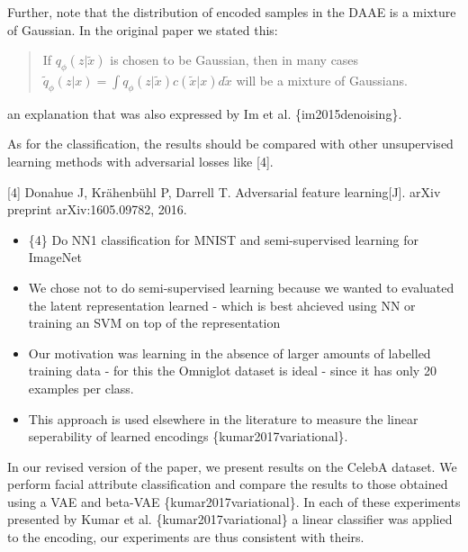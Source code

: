 \documentclass{article}
\begin{document}
Further, note that the distribution of encoded samples in the DAAE is a mixture of Gaussian. In the original paper we stated this:

\begin{quote}
If $q_\phi(z|\tilde{x})$ is chosen to be Gaussian, then in many cases $\tilde{q}_\phi(z|x) = \int q_\phi(z|\tilde{x})c(\tilde{x}|x)d \tilde{x}$ will be a mixture of Gaussians.
\end{quote}
an explanation that was also expressed by Im et al. \{im2015denoising\}.\\



{\color{blue}
As for the classification, the results should be compared with other unsupervised learning methods with adversarial losses like [4].

[4] Donahue J, Krähenbühl P, Darrell T. Adversarial feature learning[J]. arXiv preprint arXiv:1605.09782, 2016.}

\begin{itemize}
    \item \{4\} Do NN1 classification for MNIST and semi-supervised learning for ImageNet
    \item We chose not to do semi-supervised learning because we wanted to evaluated the latent representation learned - which is best ahcieved using NN or training an SVM on top of the representation
    \item Our motivation was learning in the absence of larger amounts of labelled training data - for this the Omniglot dataset is ideal - since it has only 20 examples per class.
    \item This approach is used elsewhere in the literature to measure the linear seperability of learned encodings \{kumar2017variational\}.
\end{itemize}

In our revised version of the paper, we present results on the CelebA dataset. We perform facial attribute classification and compare the results to those obtained using a VAE and beta-VAE \{kumar2017variational\}. In each of these experiments presented by Kumar et al. \{kumar2017variational\} a linear classifier was applied to the encoding, our experiments are thus consistent with theirs.
\end{document}
